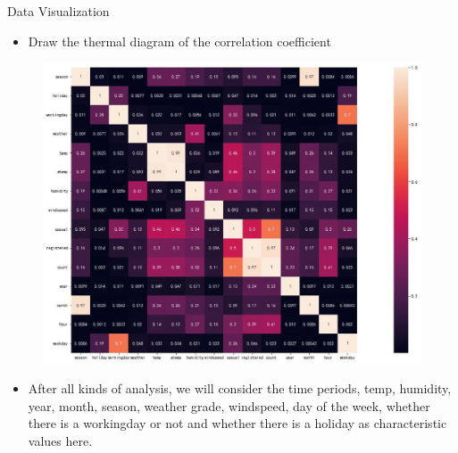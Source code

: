 \documentclass[
 size=14pt,
 paper=smartboard,  %
 mode=present, 		%
 display=slides, 	%
 style=tuliplab,  	%
 pauseslide,
 fleqn,leqno]{powerdot}
\begin{document}
\begin{slide}[toc=,bm=]{Data  Visualization}
  \begin{center}

    {
      \begin{itemize}
        
          \item Draw the thermal diagram of the correlation coefficient
      \end{itemize} 
        \begin{figure}
          \centering
          \includegraphics[height=0.3\textwidth]{pic/hot (1).eps}
          \centering
        \end{figure} 
        \begin{itemize}
        
          \item After all kinds of analysis, we will consider the time periods, temp, humidity, year, month, season, weather grade, windspeed, day of the week, whether there is a workingday or not and whether there is a holiday as characteristic values here.
      \end{itemize} 
    }
    \end{center}
 


\end{slide}
\end{document}
